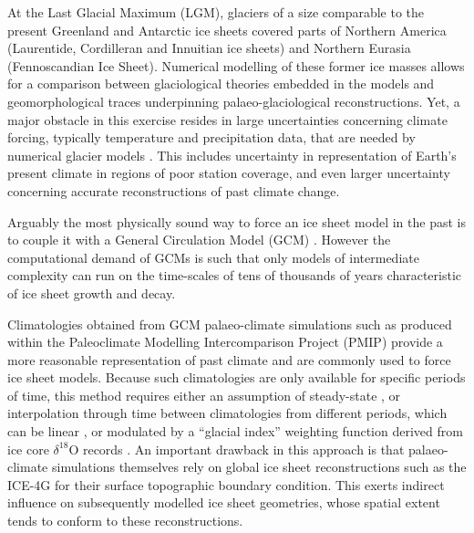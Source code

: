 \introduction
\label{sec:intro}

At the Last Glacial Maximum (LGM), glaciers of a size comparable to the present Greenland and Antarctic ice sheets covered parts of Northern America (Laurentide, Cordilleran and Innuitian ice sheets) and Northern Eurasia (Fennoscandian Ice Sheet). Numerical modelling of these former ice masses allows for a comparison between glaciological theories embedded in the models and geomorphological traces underpinning palaeo-glaciological reconstructions. Yet, a major obstacle in this exercise resides in large uncertainties concerning climate forcing, typically temperature and precipitation data, that are needed by numerical glacier models \citep{hebeler-etal-2008}. This includes uncertainty in representation of Earth's present climate in regions of poor station coverage, and even larger uncertainty concerning accurate reconstructions of past climate change.

Arguably the most physically sound way to force an ice sheet model in the past is to couple it with a General Circulation Model (GCM) \citep{yoshimori-etal-2001,calov-etal-2002,abeouchi-etal-2007,charbit-etal-2013}. However the computational demand of GCMs is such that only models of intermediate complexity can run on the time-scales of tens of thousands of years characteristic of ice sheet growth and decay.

Climatologies obtained from GCM palaeo-climate simulations such as produced within the Paleoclimate Modelling Intercomparison Project (PMIP) \citep{joussaume-taylor-1995} provide a more reasonable representation of past climate and are commonly used to force ice sheet models. Because such climatologies are only available for specific periods of time, this method requires either an assumption of steady-state \citep{huybrechts-tsiobbel-1996}, or interpolation through time between climatologies from different periods, which can be linear \citep{charbit-etal-2002}, or modulated by a ``glacial index'' weighting function derived from ice core $\delta^{18}$O records \citep{marshall-clarke-1999,tarasov-peltier-2004,zweck-huybrechts-2005,gregoire-etal-2012}. An important drawback in this approach is that palaeo-climate simulations themselves rely on global ice sheet reconstructions such as the ICE-4G \citep{peltier-1994} for their surface topographic boundary condition. This exerts indirect influence on subsequently modelled ice sheet geometries, whose spatial extent tends to conform to these reconstructions.

